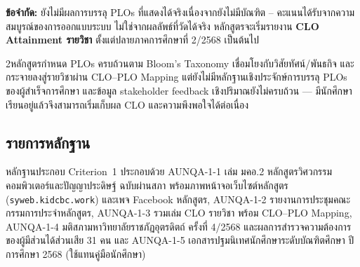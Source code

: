 \textbf{ข้อจำกัด:} ยังไม่มีผลการบรรลุ PLOs ที่แสดงได้จริงเนื่องจากยังไม่มีบัณฑิต -- คะแนนได้รับจากความสมบูรณ์ของการออกแบบระบบ ไม่ใช่จากผลลัพธ์ที่วัดได้จริง หลักสูตรจะเริ่มรายงาน \textbf{CLO Attainment รายวิชา} ตั้งแต่ปลายภาคการศึกษาที่ 2/2568 เป็นต้นไป

\begin{selfassessmentbox}{2}{หลักสูตรกำหนด PLOs ครบถ้วนตาม Bloom's Taxonomy เชื่อมโยงกับวิสัยทัศน์/พันธกิจ และกระจายลงสู่รายวิชาผ่าน CLO--PLO Mapping แต่ยังไม่มีหลักฐานเชิงประจักษ์การบรรลุ PLOs ของผู้สำเร็จการศึกษา และข้อมูล stakeholder feedback เชิงปริมาณยังไม่ครบถ้วน — มีนักศึกษาเรียนอยู่แล้วจึงสามารถเริ่มเก็บผล CLO และความพึงพอใจได้ต่อเนื่อง}
\end{selfassessmentbox}

\subsection*{รายการหลักฐาน}

หลักฐานประกอบ Criterion~1 ประกอบด้วย AUNQA-1-1 เล่ม มคอ.2 หลักสูตรวิศวกรรมคอมพิวเตอร์และปัญญาประดิษฐ์ ฉบับผ่านสภา พร้อมภาพหน้าจอเว็บไซต์หลักสูตร (\texttt{syweb.kidcbc.work}) และเพจ Facebook หลักสูตร, AUNQA-1-2 รายงานการประชุมคณะกรรมการประจำหลักสูตร, AUNQA-1-3 รวมเล่ม CLO รายวิชา พร้อม CLO--PLO Mapping, AUNQA-1-4 มติสภามหาวิทยาลัยราชภัฏอุตรดิตถ์ ครั้งที่ 4/2568 และผลการสำรวจความต้องการของผู้มีส่วนได้ส่วนเสีย 31 คน และ AUNQA-1-5 เอกสารปฐมนิเทศนักศึกษาระดับบัณฑิตศึกษา ปีการศึกษา 2568 (ใช้แทนคู่มือนักศึกษา)
